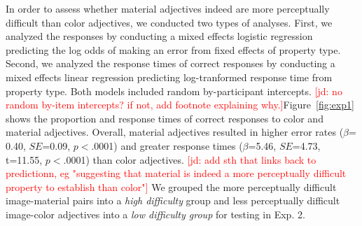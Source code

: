 \documentclass[12pt,letterpaper]{article}
\newcommand{\jd}[1]{\textcolor{Red}{[jd: #1]}}
\begin{document}
In order to assess whether material adjectives indeed are more perceptually difficult than color adjectives, we conducted two types of analyses. First, we analyzed the responses by conducting a mixed effects logistic regression predicting the log odds of making an error from fixed effects of property type. Second, we analyzed the response times of correct responses by conducting a mixed effects linear regression predicting log-tranformed response time from property type. Both models included random by-participant intercepts. \jd{no random by-item intercepts? if not, add footnote explaining why.}Figure~\ref{fig:exp1} shows the proportion and response times of correct responses to color and material adjectives. Overall, material adjectives resulted in higher error rates ($\beta$= 0.40, $SE$=0.09, $p$$<$.0001) and greater response times ($\beta$=5.46, $SE$=4.73, t=11.55, $p$$<$.0001) than color adjectives. \jd{add sth that links back to predictionn, eg "suggesting that material is indeed a more perceptually difficult property to establish than color"} We grouped the more perceptually difficult image-material pairs into a \textit{high difficulty} group and less perceptually difficult image-color adjectives into a \textit{low difficulty group} for testing in Exp. 2.
\end{document}
